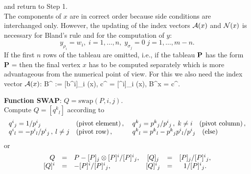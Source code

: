 \eeqn
and return to Step 1.\\
The components of $x$ are in correct order because side conditions are
interchanged only. However, the updating of the index vectors
$\A(x)$ and
$\N(x)$ is necessary for {\sc Bland}'s rule and for the computation of $y$:
\[
y_{\rho _i} = w_i, \; i = 1, \ldots,n, \; y_{\sigma _j} = 0 \; j = 1,
\ldots, m - n.
\]
If the first $n$ rows of the tableau are omitted, i.e., if the tableau ${\bf
P}$ has the form
\beqn
{\bf P} = \left[
\begin{array}{cc}
B^{\N}A & r\\
w & f \\
\end{array}
\right]
\eeqn
then the final vertex $x$ has to be computed separately which is more
advantageous from the numerical point of view. For this we also need the
index vector  $\A(x)$:
\beqn
B^{\A} := [b^i]_{i \in \A(x)}, \; c^{\A} = [\gamma ^i]_{i \in \A(x)}, \;
B^{\A}x = c^{\A}.
\eeqn
\par
{\bf Function SWAP}: $Q = \mbox{swap}(P,i,j)$.\\
Compute $Q = [q^k{}_l]$ according to
\[
\ba{.}{lll}
q^i{}_j = 1/p^i{}_j & \mbox{(pivot element)}\,,\; &
q^k{}_j = p^k{}_j/p^i{}_j \,,\;k \neq i  \quad \mbox{(pivot column)}\,,\\
q^i{}_l = - p^i{}_l/p^i{}_j\,,\: l \neq j
& \mbox{(pivot row)}\,,\; & q^k{}_l =  p^k{}_l - p^k{}_jp^i{}_l/p^i{}_j
\quad\mbox{(else)}
\ea{.}
\]
or
\[ \ba{.}{rclcrcl}
Q &=& P - [P]_j \otimes [P]^i/[P]^i{}_j, &
[Q]_j &=& [P]_j/[P]^i{}_j,\\[0mm]
[Q]^i &=& - [P]^i/[P]^i{}_j, &
[Q]^i{}_j &=& 1/[P]^i{}_j.
\ea{.}
\]
